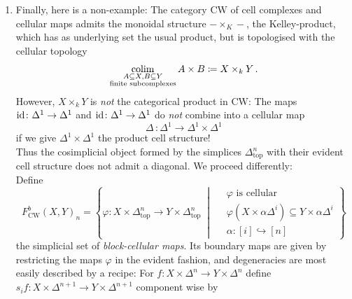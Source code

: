 \begin{enumerate}[label=\roman*)]
                \begin{equation*}
                    F_{\mathrm{sAb}}(X, Y) \hookrightarrow F_{\sSet}(X, y) \,.
                \end{equation*}
            \item 
                Finally, here is a non-example: The category $\mathrm{CW}$ of cell complexes and cellular maps admits the monoidal structure $- \times_K -$, the Kelley-product, which has as underlying set the usual product, but is topologised with the cellular topology
                \begin{equation*}
                    \operatorname*{colim}_{\substack{A \subseteq X, B \subseteq Y \\ \text{finite subcomplexes}}} A \times B \coloneqq X \times_k Y \,.
                \end{equation*}
                However, $X \times_k Y$ is \emph{not} the categorical product in $\mathrm{CW}$: The maps $\operatorname{id} \colon \Delta^1 \to \Delta^1$ and $\operatorname{id} \colon \Delta^1 \to \Delta^1$ do \emph{not} combine into a cellular map
                \begin{equation*}
                    \Delta \,\colon \Delta^1 \to \Delta^1 \times \Delta^1
                \end{equation*}
                if we give $\Delta^1 \times \Delta^1$ the product cell structure!\\
                Thus the cosimplicial object formed by the simplices $\Delta^n_{\mathrm{top}}$ with their evident cell structure does not admit a diagonal. We proceed differently: \\
                Define
                \begin{equation*}
                    F^b_{\mathrm{CW}}(X, Y)_n =
                    \left\{
                    \varphi \colon X \times \Delta^n_{\mathrm{top}} \to Y \times \Delta^n_{\mathrm{top}}
                    \;\middle|\;
                    \begin{alignedat}{1}
                        &\varphi \text{ is cellular}\\
                        &\varphi(X \times \alpha \Delta^i) \subseteq Y \times \alpha \Delta^i \\
                        &\alpha \colon [i] \hookrightarrow [n]
                    \end{alignedat}
                    \right\}
                \end{equation*}
                the simplicial set of \emph{block-cellular maps}. Its boundary maps are given by restricting the maps $\varphi$ in the evident fashion, and degeneracies are most easily described by a recipe: For $f \colon X \times \Delta^n \to Y \times \Delta^n$ define $s_i f \colon X \times \Delta^{n+1} \to Y \times \Delta^{n+1}$ component wise by

\end{enumerate}
